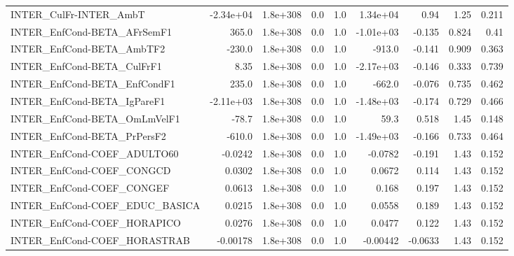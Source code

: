\begin{tabular}{lrrrrrrrr}
INTER\_CulFr-INTER\_AmbT                &   -2.34e+04 &     1.8e+308 &     0.0 &      1.0 &   1.34e+04 &        0.94 &         1.25 &         0.211 \\
INTER\_EnfCond-BETA\_AFrSemF1           &       365.0 &     1.8e+308 &     0.0 &      1.0 &  -1.01e+03 &      -0.135 &        0.824 &          0.41 \\
INTER\_EnfCond-BETA\_AmbTF2             &      -230.0 &     1.8e+308 &     0.0 &      1.0 &     -913.0 &      -0.141 &        0.909 &         0.363 \\
INTER\_EnfCond-BETA\_CulFrF1            &        8.35 &     1.8e+308 &     0.0 &      1.0 &  -2.17e+03 &      -0.146 &        0.333 &         0.739 \\
INTER\_EnfCond-BETA\_EnfCondF1          &       235.0 &     1.8e+308 &     0.0 &      1.0 &     -662.0 &      -0.076 &        0.735 &         0.462 \\
INTER\_EnfCond-BETA\_IgPareF1           &   -2.11e+03 &     1.8e+308 &     0.0 &      1.0 &  -1.48e+03 &      -0.174 &        0.729 &         0.466 \\
INTER\_EnfCond-BETA\_OmLmVelF1          &       -78.7 &     1.8e+308 &     0.0 &      1.0 &       59.3 &       0.518 &         1.45 &         0.148 \\
INTER\_EnfCond-BETA\_PrPersF2           &      -610.0 &     1.8e+308 &     0.0 &      1.0 &  -1.49e+03 &      -0.166 &        0.733 &         0.464 \\
INTER\_EnfCond-COEF\_ADULTO60           &     -0.0242 &     1.8e+308 &     0.0 &      1.0 &    -0.0782 &      -0.191 &         1.43 &         0.152 \\
INTER\_EnfCond-COEF\_CONGCD             &      0.0302 &     1.8e+308 &     0.0 &      1.0 &     0.0672 &       0.114 &         1.43 &         0.152 \\
INTER\_EnfCond-COEF\_CONGEF             &      0.0613 &     1.8e+308 &     0.0 &      1.0 &      0.168 &       0.197 &         1.43 &         0.152 \\
INTER\_EnfCond-COEF\_EDUC\_BASICA        &      0.0215 &     1.8e+308 &     0.0 &      1.0 &     0.0558 &       0.189 &         1.43 &         0.152 \\
INTER\_EnfCond-COEF\_HORAPICO           &      0.0276 &     1.8e+308 &     0.0 &      1.0 &     0.0477 &       0.122 &         1.43 &         0.152 \\
INTER\_EnfCond-COEF\_HORASTRAB          &    -0.00178 &     1.8e+308 &     0.0 &      1.0 &   -0.00442 &     -0.0633 &         1.43 &         0.152 \\

\end{tabular}
